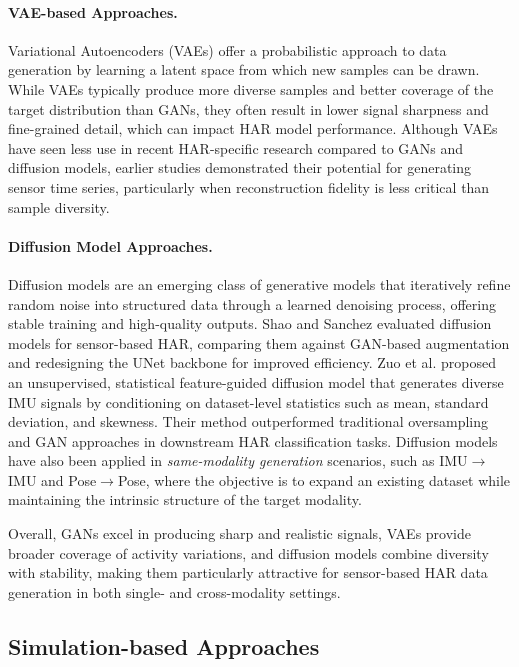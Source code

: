 \paragraph{VAE-based Approaches.}
Variational Autoencoders (VAEs) offer a probabilistic approach to data generation by learning a latent space from which new samples can be drawn. While VAEs typically produce more diverse samples and better coverage of the target distribution than GANs, they often result in lower signal sharpness and fine-grained detail, which can impact HAR model performance. Although VAEs have seen less use in recent HAR-specific research compared to GANs and diffusion models, earlier studies demonstrated their potential for generating sensor time series, particularly when reconstruction fidelity is less critical than sample diversity.

\paragraph{Diffusion Model Approaches.}
Diffusion models are an emerging class of generative models that iteratively refine random noise into structured data through a learned denoising process, offering stable training and high-quality outputs. Shao and Sanchez \cite{shao2023study} evaluated diffusion models for sensor-based HAR, comparing them against GAN-based augmentation and redesigning the UNet backbone for improved efficiency. Zuo et al. \cite{zuo2023unsupervised} proposed an unsupervised, statistical feature-guided diffusion model that generates diverse IMU signals by conditioning on dataset-level statistics such as mean, standard deviation, and skewness. Their method outperformed traditional oversampling and GAN approaches in downstream HAR classification tasks. Diffusion models have also been applied in \textit{same-modality generation} scenarios, such as IMU$\rightarrow$IMU and Pose$\rightarrow$Pose, where the objective is to expand an existing dataset while maintaining the intrinsic structure of the target modality.

Overall, GANs excel in producing sharp and realistic signals, VAEs provide broader coverage of activity variations, and diffusion models combine diversity with stability, making them particularly attractive for sensor-based HAR data generation in both single- and cross-modality settings.


\subsection{Simulation-based Approaches}

